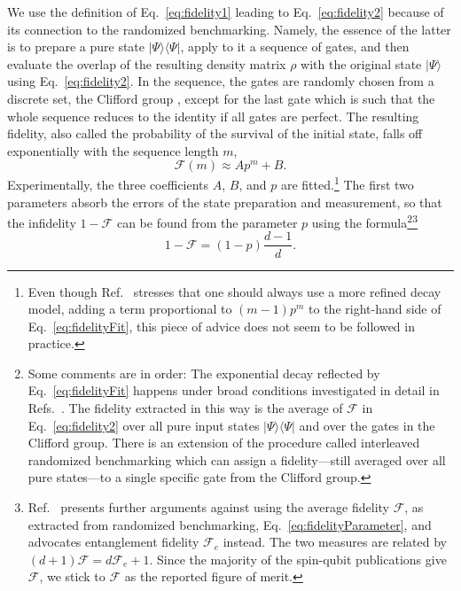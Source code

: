 \documentclass[aps, prx, showpacs, twocolumn, superscriptaddress, notitlepage, longbibliography, floatfix, nofootinbib]{revtex4-2}
\begin{document}
We use the definition of Eq.~\eqref{eq:fidelity1} leading to Eq.~\eqref{eq:fidelity2} because of its connection to the randomized benchmarking. Namely, the essence of the latter is to prepare a pure state $|\Psi\rangle \langle \Psi|$, apply to it a sequence of gates, and then evaluate the overlap of the resulting density matrix $\rho$ with the original state $|\Psi\rangle$ using Eq.~\ref{eq:fidelity2}. In the sequence, the gates are randomly chosen from a discrete set, the Clifford group \cite{gottesman_theory_1998}, except for the last gate which is such that the whole sequence reduces to the identity if all gates are perfect. The resulting fidelity, also called the probability of the survival of the initial state, falls off exponentially with the sequence length $m$,
\begin{equation}
\mathcal{F}(m) \approx A p^m + B.
\label{eq:fidelityFit}
\end{equation}
Experimentally, the three coefficients $A$, $B$, and $p$ are fitted.\footnote{Even though Ref.~\cite{magesan_characterizing_2012} stresses that one should always use a more refined decay model, adding a term proportional to $(m-1)p^m$ to the right-hand side of Eq.~\eqref{eq:fidelityFit}, this piece of advice does not seem to be followed in practice.} The first two parameters absorb the errors of the state preparation and measurement, so that the infidelity $1-\mathcal{F}$ can be found from the parameter $p$ using the formula\footnote{Some comments are in order: The exponential decay reflected by Eq.~\eqref{eq:fidelityFit} happens under broad conditions investigated in detail in Refs.~\cite{magesan_characterizing_2012,epstein_investigating_2014}. The fidelity extracted in this way is the average of $\mathcal{F}$ in Eq.~\eqref{eq:fidelity2} over all pure input states $|\Psi\rangle\langle \Psi|$ and over the gates in the Clifford group. There is an extension of the procedure called interleaved randomized benchmarking \cite{magesan_efficient_2012} which can assign a fidelity---still averaged over all pure states---to a single specific gate from the Clifford group.}\footnote{Ref.~\cite{gilchrist_distance_2005} presents further arguments against using the average fidelity $\mathcal{F}$, as extracted from randomized benchmarking, Eq.~\eqref{eq:fidelityParameter}, and advocates entanglement fidelity $\mathcal{F}_e$ instead. The two measures are related by $(d+1)\mathcal{F}=d\mathcal{F}_e+1$. Since the majority of the spin-qubit publications give $\mathcal{F}$, we stick to $\mathcal{F}$ as the reported figure of merit.}
\begin{equation}
1-\mathcal{F} = (1-p) \frac{d-1}{d}.
\label{eq:fidelityParameter}
\end{equation}
\end{document}
